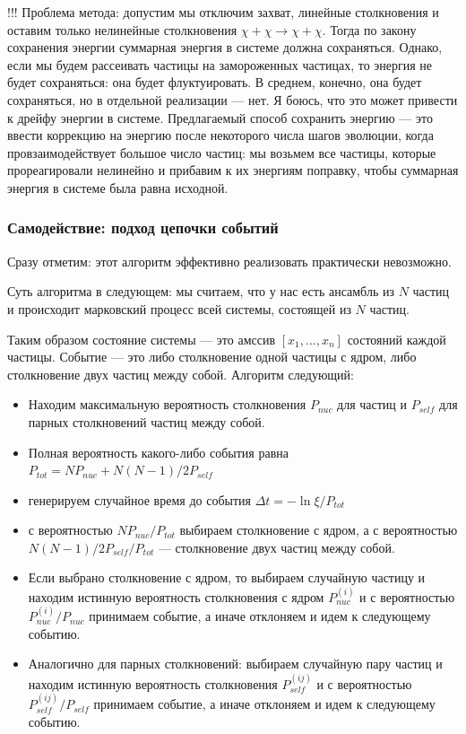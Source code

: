 !!! Проблема метода: допустим мы отключим захват, линейные столкновения и оставим только нелинейные столкновения $\chi + \chi \to \chi + \chi$. Тогда по закону сохранения энергии суммарная энергия в системе должна сохраняться. Однако, если мы будем рассеивать частицы на замороженных частицах, то энергия не будет сохраняться: она будет флуктуировать. В среднем, конечно, она будет сохраняться, но в отдельной реализации --- нет. Я боюсь, что это может привести к дрейфу энергии в системе. Предлагаемый способ сохранить энергию --- это ввести коррекцию на энергию после некоторого числа шагов эволюции, когда провзаимодействует большое число частиц: мы возьмем все частицы, которые прореагировали нелинейно и прибавим к их энергиям поправку, чтобы суммарная энергия в системе была равна исходной. 

\subsubsection{Самодействие: подход цепочки событий}

Сразу отметим: этот алгоритм эффективно реализовать практически невозможно.

Суть алгоритма в следующем: мы считаем, что у нас есть ансамбль из $N$ частиц и происходит марковский процесс всей системы, состоящей из $N$ частиц. 

Таким образом состояние системы --- это амссив $[x_1,...,x_n]$ состояний каждой частицы.
Событие --- это либо столкновение одной частицы с ядром, либо столкновение двух частиц между собой.
Алгоритм следующий:
\begin{itemize}
	\item Находим максимальную вероятность столкновения $P_{nuc}$ для частиц и $P_{self}$ для парных столкновений частиц между собой.
	\item Полная вероятность какого-либо события равна $P_{tot} = N P_{nuc} + N(N-1)/2 P_{self}$
	\item генерируем случайное время до события $\Delta t = -\ln \xi / P_{tot}$ 
	\item с вероятностью $N P_{nuc}/P_{tot}$ выбираем столкновение с ядром, а с вероятностью $N(N-1)/2 P_{self}/P_{tot}$ --- столкновение двух частиц между собой.
	\item Если выбрано столкновение с ядром, то выбираем случайную частицу и находим истинную вероятность столкновения с ядром $P_{nuc}^{(i)}$ и с вероятностью $P_{nuc}^{(i)}/P_{nuc}$ принимаем событие, а иначе отклоняем и идем к следующему событию.
	\item Аналогично для парных столкновений: выбираем случайную пару частиц и находим истинную вероятность столкновения $P_{self}^{(ij)}$ и с вероятностью $P_{self}^{(ij)}/P_{self}$ принимаем событие, а иначе отклоняем и идем к следующему событию.
\end{itemize}

